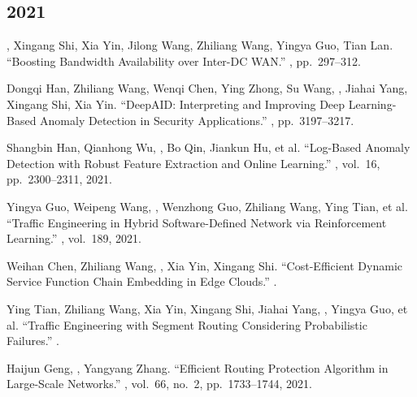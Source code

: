 \documentclass[11pt]{article}
\begin{document}
\subsection*{2021}
\begin{publist}
\item {}, Xingang Shi\corr, Xia Yin, Jilong Wang, Zhiliang Wang, Yingya
Guo, Tian Lan. ``Boosting Bandwidth Availability over Inter-DC WAN.''
, pp.~297--312.
\item Dongqi Han, Zhiliang Wang\corr, Wenqi Chen, Ying Zhong, Su Wang, ,
Jiahai Yang, Xingang Shi, Xia Yin. ``DeepAID: Interpreting and Improving Deep
Learning-Based Anomaly Detection in Security Applications.'' ,
pp.~3197--3217.
\item Shangbin Han, Qianhong Wu, \corr, Bo Qin, Jiankun Hu, et al.
``Log-Based Anomaly Detection with Robust Feature Extraction and Online Learning.''
, vol.~16,
pp.~2300--2311, 2021.
\item Yingya Guo, Weipeng Wang, , Wenzhong Guo, Zhiliang Wang, Ying
Tian, et al. ``Traffic Engineering in Hybrid Software-Defined Network via
Reinforcement Learning.'' ,
vol.~189, 2021.
\item Weihan Chen, Zhiliang Wang\corr, , Xia Yin, Xingang Shi.
``Cost-Efficient Dynamic Service Function Chain Embedding in Edge Clouds.''
.
\item Ying Tian, Zhiliang Wang\corr, Xia Yin, Xingang Shi, Jiahai Yang, , Yingya Guo, et al. ``Traffic Engineering with Segment Routing Considering
Probabilistic Failures.'' .
\item Haijun Geng, \corr, Yangyang Zhang. ``Efficient Routing Protection
Algorithm in Large-Scale Networks.'' ,
vol.~66, no.~2, pp.~1733--1744, 2021.
\end{publist}
\end{document}
